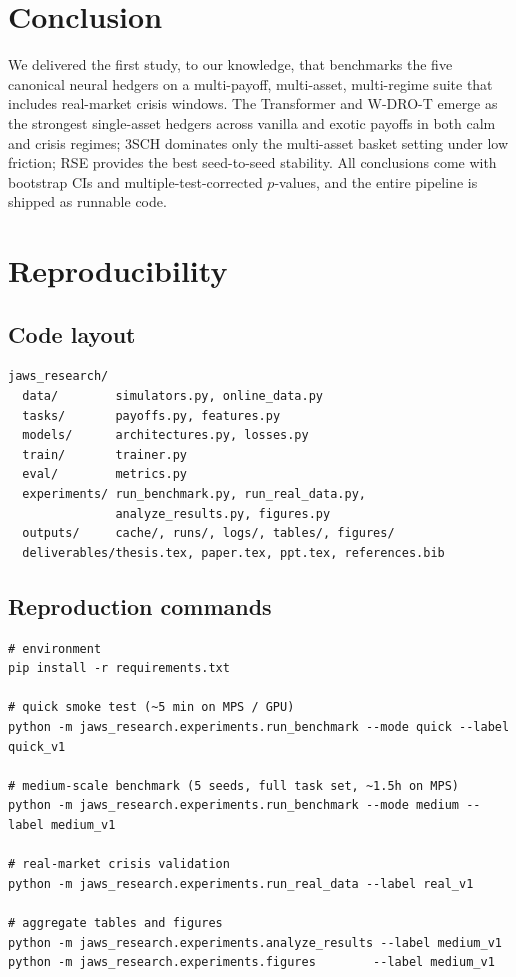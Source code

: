 \documentclass[11pt,a4paper]{article}
\begin{document}
\section{Conclusion}\label{sec:conclusion}

We delivered the first study, to our knowledge, that benchmarks the five
canonical neural hedgers on a multi-payoff, multi-asset, multi-regime suite
that includes real-market crisis windows.  The Transformer and W-DRO-T
emerge as the strongest single-asset hedgers across vanilla and exotic
payoffs in both calm and crisis regimes; 3SCH dominates only the
multi-asset basket setting under low friction; RSE provides the best
seed-to-seed stability.  All conclusions come with bootstrap CIs and
multiple-test-corrected $p$-values, and the entire pipeline is shipped
as runnable code.



\appendix
\section{Reproducibility}\label{app:repro}

\subsection{Code layout}
\begin{verbatim}
jaws_research/
  data/        simulators.py, online_data.py
  tasks/       payoffs.py, features.py
  models/      architectures.py, losses.py
  train/       trainer.py
  eval/        metrics.py
  experiments/ run_benchmark.py, run_real_data.py,
               analyze_results.py, figures.py
  outputs/     cache/, runs/, logs/, tables/, figures/
  deliverables/thesis.tex, paper.tex, ppt.tex, references.bib
\end{verbatim}

\subsection{Reproduction commands}
\begin{verbatim}
# environment
pip install -r requirements.txt

# quick smoke test (~5 min on MPS / GPU)
python -m jaws_research.experiments.run_benchmark --mode quick --label quick_v1

# medium-scale benchmark (5 seeds, full task set, ~1.5h on MPS)
python -m jaws_research.experiments.run_benchmark --mode medium --label medium_v1

# real-market crisis validation
python -m jaws_research.experiments.run_real_data --label real_v1

# aggregate tables and figures
python -m jaws_research.experiments.analyze_results --label medium_v1
python -m jaws_research.experiments.figures        --label medium_v1
\end{verbatim}
\end{document}
